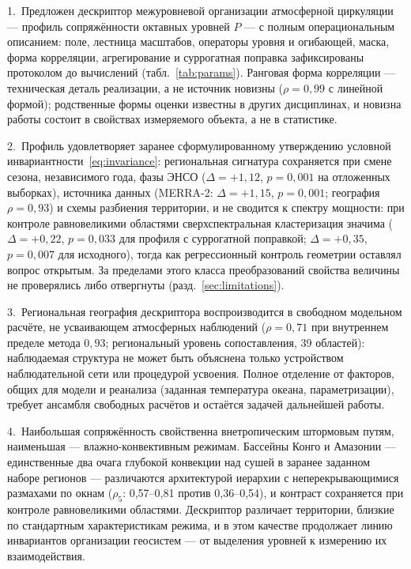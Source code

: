 \documentclass[11pt,a4paper]{article}
\begin{document}
1.~Предложен дескриптор межуровневой организации атмосферной циркуляции --- профиль сопряжённости октавных уровней $P$ --- с полным операциональным описанием: поле, лестница масштабов, операторы уровня и огибающей, маска, форма корреляции, агрегирование и суррогатная поправка зафиксированы протоколом до вычислений (табл.~\ref{tab:params}). Ранговая форма корреляции --- техническая деталь реализации, а не источник новизны ($\rho=0{,}99$ с линейной формой); родственные формы оценки известны в других дисциплинах, и новизна работы состоит в свойствах измеряемого объекта, а не в статистике.

2.~Профиль удовлетворяет заранее сформулированному утверждению условной инвариантности~\eqref{eq:invariance}: региональная сигнатура сохраняется при смене сезона, независимого года, фазы ЭНСО ($\Delta=+1{,}12$, $p=0{,}001$ на отложенных выборках), источника данных (MERRA-2: $\Delta=+1{,}15$, $p=0{,}001$; география $\rho=0{,}93$) и схемы разбиения территории, и не сводится к спектру мощности: при контроле равновеликими областями сверхспектральная кластеризация значима ($\Delta=+0{,}22$, $p=0{,}033$ для профиля с суррогатной поправкой; $\Delta=+0{,}35$, $p=0{,}007$ для исходного), тогда как регрессионный контроль геометрии оставлял вопрос открытым. За пределами этого класса преобразований свойства величины не проверялись либо отвергнуты (разд.~\ref{sec:limitations}).

3.~Региональная география дескриптора воспроизводится в свободном модельном расчёте, не усваивающем атмосферных наблюдений ($\rho=0{,}71$ при внутреннем пределе метода $0{,}93$; региональный уровень сопоставления, 39 областей): наблюдаемая структура не может быть объяснена только устройством наблюдательной сети или процедурой усвоения. Полное отделение от факторов, общих для модели и реанализа (заданная температура океана, параметризации), требует ансамбля свободных расчётов и остаётся задачей дальнейшей работы.

4.~Наибольшая сопряжённость свойственна внетропическим штормовым путям, наименьшая --- влажно-конвективным режимам. Бассейны Конго и Амазонии --- единственные два очага глубокой конвекции над сушей в заранее заданном наборе регионов --- различаются архитектурой иерархии с неперекрывающимися размахами по окнам ($\rho_5$: 0,57--0,81 против 0,36--0,54), и контраст сохраняется при контроле равновеликими областями. Дескриптор различает территории, близкие по стандартным характеристикам режима, и в этом качестве продолжает линию инвариантов организации геосистем --- от выделения уровней к измерению их взаимодействия.
\end{document}
